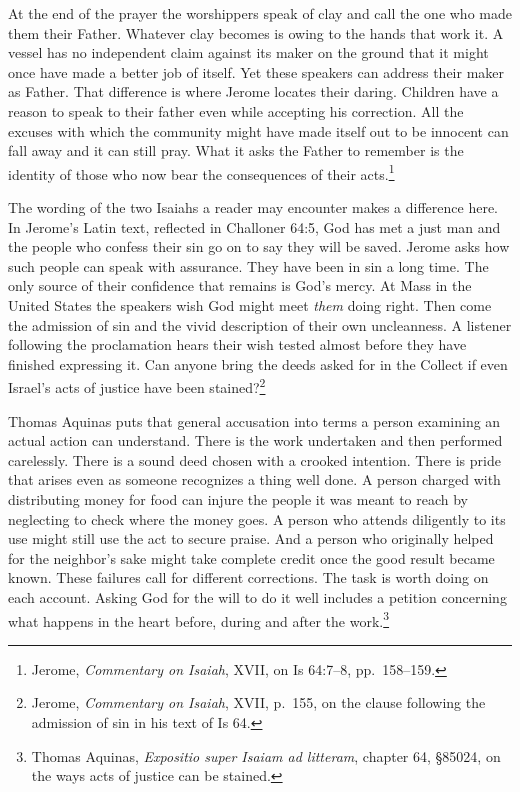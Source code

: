 At the end of the prayer the worshippers speak of clay and call the one who made them their Father. Whatever clay becomes is owing to the hands that work it. A vessel has no independent claim against its maker on the ground that it might once have made a better job of itself. Yet these speakers can address their maker as Father. That difference is where Jerome locates their daring. Children have a reason to speak to their father even while accepting his correction. All the excuses with which the community might have made itself out to be innocent can fall away and it can still pray. What it asks the Father to remember is the identity of those who now bear the consequences of their acts.\footnote{Jerome, \textit{Commentary on Isaiah}, XVII, on Is 64:7--8, pp.~158--159.}

The wording of the two Isaiahs a reader may encounter makes a difference here. In Jerome's Latin text, reflected in Challoner 64:5, God has met a just man and the people who confess their sin go on to say they will be saved. Jerome asks how such people can speak with assurance. They have been in sin a long time. The only source of their confidence that remains is God's mercy. At Mass in the United States the speakers wish God might meet \emph{them} doing right. Then come the admission of sin and the vivid description of their own uncleanness. A listener following the proclamation hears their wish tested almost before they have finished expressing it. Can anyone bring the deeds asked for in the Collect if even Israel's acts of justice have been stained?\footnote{Jerome, \textit{Commentary on Isaiah}, XVII, p.~155, on the clause following the admission of sin in his text of Is 64.}

Thomas Aquinas puts that general accusation into terms a person examining an actual action can understand. There is the work undertaken and then performed carelessly. There is a sound deed chosen with a crooked intention. There is pride that arises even as someone recognizes a thing well done. A person charged with distributing money for food can injure the people it was meant to reach by neglecting to check where the money goes. A person who attends diligently to its use might still use the act to secure praise. And a person who originally helped for the neighbor's sake might take complete credit once the good result became known. These failures call for different corrections. The task is worth doing on each account. Asking God for the will to do it well includes a petition concerning what happens in the heart before, during and after the work.\footnote{Thomas Aquinas, \textit{Expositio super Isaiam ad litteram}, chapter 64, §85024, on the ways acts of justice can be stained.}

